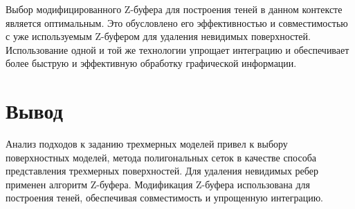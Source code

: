 
Выбор модифицированного Z-буфера для построения теней в данном контексте является оптимальным. Это обусловлено его эффективностью и совместимостью с уже используемым Z-буфером для удаления невидимых поверхностей. Использование одной и той же технологии упрощает интеграцию и обеспечивает более быструю и эффективную обработку графической информации.


\section{Вывод}

Анализ подходов к заданию трехмерных моделей привел к выбору поверхностных моделей, метода полигональных сеток в качестве способа представления трехмерных поверхностей. Для удаления невидимых ребер применен алгоритм Z-буфера. Модификация Z-буфера использована для построения теней, обеспечивая совместимость и упрощенную интеграцию. 